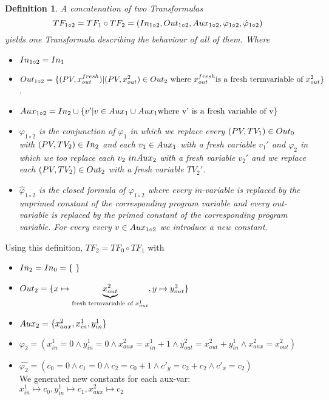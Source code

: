 \documentclass{article}
\newtheorem{mydef}{Definition}
\newcommand\mycom[1]{}
\newcommand\mycom[1]{#1}
\newcommand{\jwl}[1]{\mycom{\todo[color=blue!40,inline,caption={Beschreibung},nolist]{\small #1}}}
\begin{document}
	\begin{mydef}
		A concatenation of two Transformulas 
		\begin{equation*}
		TF_{1 \circ 2} = TF_1 \circ TF_2 = (In_{1 \circ 2}, Out_{1 \circ 2}, Aux_{1 \circ 2}, \varphi_{1 \circ 2}, \hat{\varphi}_{1 \circ 2})
		\end{equation*}  yields one Transformula describing the behaviour of all of them. Where \\
		\jwl{Are in vars fresh?}
		\begin{itemize}
			\item $In_{1 \circ 2} = In_1$
			\item $Out_{1 \circ 2} = \{ (PV, x_{out}^{fresh}) | (PV, x_{out}^{2}) \in Out_2 \text{ where } x_{out}^{fresh} \text{is a fresh termvariable of } x_{out}^2 \}$.
			\item $Aux_{1 \circ 2} = In_2 \cup \{ v' | v \in Aux_1 \cup Aux_1 \text{where v' is a fresh variable of v} \}$
			\item $\varphi_{1 \circ 2}$ is the conjunction of $\varphi_1$ in which we replace every $(PV, TV_1) \in Out_0$ with $(PV, TV_2) \in In_2$ and each $v_1 \in Aux_1$ with a fresh variable $v_1'$ and $\varphi_2$ in which we too replace each $v_2 \ in Aux_2$ with a fresh variable $v_2'$ and we replace each $(PV, TV_2) \in Out_2$ with a fresh variable $TV_2'$.
			\item $\hat{\varphi}_{1 \circ 2}$ is the closed formula of $\varphi_{1 \circ 2}$ where every in-variable is replaced by the unprimed constant of the corresponding program variable and every out-variable is replaced by the primed constant of the corresponding program variable. For every every $v \in Aux_{1 \circ 2}$ we introduce a new constant.
		\end{itemize}
	\end{mydef}
		
	\smallskip
	
	Using this definition, $TF_2 = TF_0 \circ TF_1$ with
	\begin{itemize}
		\item $\invars_2 = \invars_0 = \{ \ \}$
		\item $Out_2 = \{ x \mapsto \underbrace{x_{out}^2}_{\text{fresh termvariable of } x_{out}^1}, y \mapsto y_{out}^2\}$
		\item $Aux_2 = \{ x^2_{aux}, x_{in}^1, y_{in}^1 \} $
		\item $\varphi_2 = (x_{in}^1 = 0 \land y_{in}^1 = 0 \land x_{aux}^2 = x_{in}^1 + 1 \land y_{out}^2 = x_{out}^2 + y_{in}^1 \land x_{aux}^2 = x_{out}^2)$
		\item $\hat{\varphi_2} = (c_0 = 0 \land c_1 = 0 \land c_2 = c_0 + 1 \land c'_y = c_2 + c_2 \land c'_x = c_2)$ \\ We generated new constants for each aux-var: \\
		$x_{in}^1 \mapsto c_0, y_{in}^1 \mapsto c_1, x^2_{aux} \mapsto c_2$
	\end{itemize}
\end{document}
